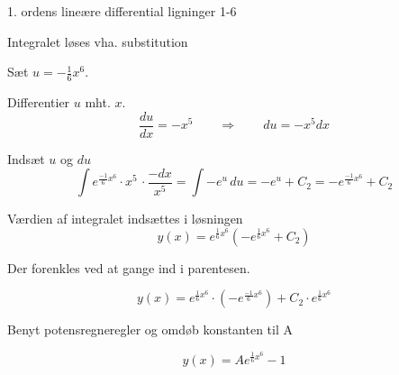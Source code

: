 \documentclass{article}
\begin{document}
\begin{exercise}{1. ordens lineære differential ligninger 1-6}
	\hint
	
	Integralet løses vha. substitution
	
	
	\hint
	Sæt $u = -\frac{1}{6}x^6$.
	
	\hint
	
	Differentier $u$ mht. $x$.
	\[
	\frac{du}{dx} = -x^5 \qquad	\Rightarrow \qquad du = -x^5 dx
	\]
	
	\hint 
	Indsæt $u$ og $du$
	\[
	\int e^{\frac{-1}{6}x^6} \cdot x^5 \, \cdot \frac{-dx}{x^5} = \int -e^{u} \, du = -e^{u} + C_2 = -e^{\frac{-1}{6}x^6} + C_2
	\]
	
	\hint
	
	Værdien af integralet indsættes i løsningen
	\[
	y(x) = e^{\frac{1}{6}x^6} \left( -e^{\frac{1}{6}x^6} + C_2\right)
	\]
	
	\hint
	
	Der forenkles ved at gange ind i parentesen.
	
	\hint
	\[
	y(x) = e^{\frac{1}{6}x^6} \cdot \left(-e^{\frac{-1}{6}x^6} \right) + C_2 \cdot e^{\frac{1}{6}x^6} 
	\]
	
	\hint
	
	Benyt potensregneregler og omdøb konstanten til A
	
	\hint
	\[
	y(x) = A e^{\frac{1}{6}x^6} - 1
	\]
	
	
\end{exercise}

\newpage
\end{document}
